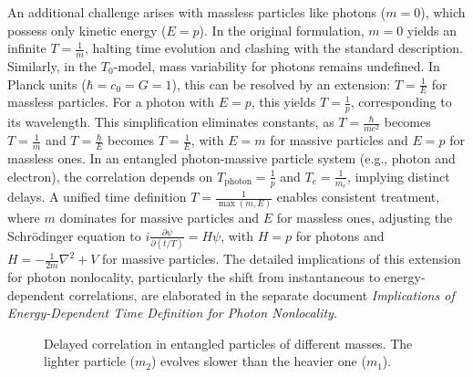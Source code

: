 \documentclass[a4paper,12pt]{article}
\begin{document}
An additional challenge arises with massless particles like photons (\( m = 0 \)), which possess only kinetic energy (\( E = p \)). In the original formulation, \( m = 0 \) yields an infinite \( T = \frac{1}{m} \), halting time evolution and clashing with the standard description. Similarly, in the \( T_0 \)-model, mass variability for photons remains undefined. In Planck units (\( \hbar = c_0 = G = 1 \)), this can be resolved by an extension: \( T = \frac{1}{E} \) for massless particles. For a photon with \( E = p \), this yields \( T = \frac{1}{p} \), corresponding to its wavelength. This simplification eliminates constants, as \( T = \frac{\hbar}{m c^2} \) becomes \( T = \frac{1}{m} \) and \( T = \frac{\hbar}{E} \) becomes \( T = \frac{1}{E} \), with \( E = m \) for massive particles and \( E = p \) for massless ones. In an entangled photon-massive particle system (e.g., photon and electron), the correlation depends on \( T_\text{photon} = \frac{1}{p} \) and \( T_e = \frac{1}{m_e} \), implying distinct delays. A unified time definition \( T = \frac{1}{\max(m, E)} \) enables consistent treatment, where \( m \) dominates for massive particles and \( E \) for massless ones, adjusting the Schrödinger equation to \( i \frac{\partial \psi}{\partial (t/T)} = H \psi \), with \( H = p \) for photons and \( H = -\frac{1}{2m} \nabla^2 + V \) for massive particles. The detailed implications of this extension for photon nonlocality, particularly the shift from instantaneous to energy-dependent correlations, are elaborated in the separate document \textit{Implications of Energy-Dependent Time Definition for Photon Nonlocality}.
	\begin{figure}[h]
		\centering
		\caption{Delayed correlation in entangled particles of different masses. The lighter particle ($m_2$) evolves slower than the heavier one ($m_1$).}
	\end{figure}
	
\end{document}
